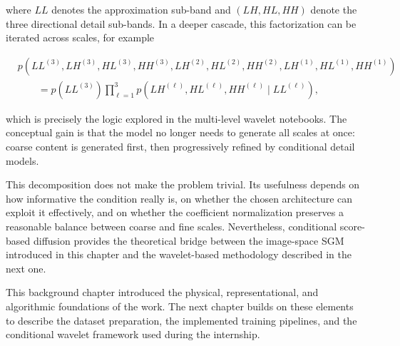 where $LL$ denotes the approximation sub-band and $(LH,HL,HH)$ denote the
three directional detail sub-bands. In a deeper cascade, this factorization can be iterated
across scales, for example

\begin{equation}
    \begin{aligned}
    &p(LL^{(3)},LH^{(3)},HL^{(3)},HH^{(3)},LH^{(2)},HL^{(2)},HH^{(2)},LH^{(1)},HL^{(1)},HH^{(1)})\\
    &\qquad =
    p(LL^{(3)})
    \prod_{\ell=1}^{3}
    p(LH^{(\ell)},HL^{(\ell)},HH^{(\ell)}\mid LL^{(\ell)}),
    \end{aligned}
\end{equation}

which is precisely the logic explored in the multi-level wavelet notebooks.
The conceptual gain is that the model no longer needs to generate all scales at
once: coarse content is generated first, then progressively refined by
conditional detail models.

This decomposition does not make the problem trivial. Its usefulness depends on
how informative the condition really is, on whether the chosen architecture can
exploit it effectively, and on whether the coefficient normalization preserves
a reasonable balance between coarse and fine scales. Nevertheless, conditional
score-based diffusion provides the theoretical bridge between the image-space
SGM introduced in this chapter and the wavelet-based methodology described in
the next one.

This background chapter introduced the physical, representational, and
algorithmic foundations of the work. The next chapter builds on these elements
to describe the dataset preparation, the implemented training pipelines, and
the conditional wavelet framework used during the internship.
